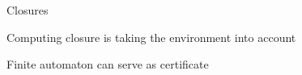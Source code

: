 \documentclass[../talk.tex]{subfiles}
\begin{document}
\begin{frame}{Closures}
    \begin{overlayarea}{\slidewidth}{\slideheight}

        \begin{compproblem}
        \end{compproblem}

        \begin{compproblem}
        \end{compproblem}

        \vspace*{1em}

        {%
            Computing closure is taking the \alert{environment} into account
        }

        \vspace*{1em}

        {%
            Finite automaton can serve as \alert{certificate}
        }

    \end{overlayarea}
\end{frame}
\end{document}
